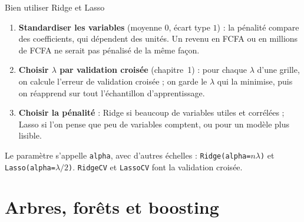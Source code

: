 \documentclass[aspectratio=169,11pt]{beamer}
\begin{document}
\begin{frame}{Bien utiliser Ridge et Lasso}
  \begin{enumerate}
    \item \textbf{Standardiser les variables} (moyenne $0$, écart type $1$) : la pénalité compare des coefficients, qui dépendent des unités. Un revenu en FCFA ou en millions de FCFA ne serait pas pénalisé de la même façon.
    \item \textbf{Choisir $\lambda$ par validation croisée} (chapitre~1) : pour chaque $\lambda$ d'une grille, on calcule l'erreur de validation croisée ; on garde le $\lambda$ qui la minimise, puis on réapprend sur tout l'échantillon d'apprentissage.
    \item \textbf{Choisir la pénalité} : Ridge si beaucoup de variables utiles et corrélées ; Lasso si l'on pense que peu de variables comptent, ou pour un modèle plus lisible.
  \end{enumerate}
  \begin{remarque}
    Le paramètre s'appelle \texttt{alpha}, avec d'autres échelles : \texttt{Ridge(alpha=}$n\lambda$\texttt{)} et \texttt{Lasso(alpha=}$\lambda/2$\texttt{)}. \texttt{RidgeCV} et \texttt{LassoCV} font la validation croisée.
  \end{remarque}
\end{frame}

\section{Arbres, forêts et boosting}
\end{document}
